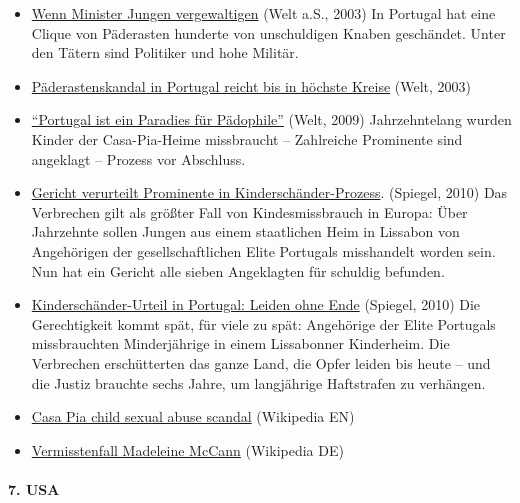 \begin{itemize}
\tightlist
\item
  \href{https://www.welt.de/print-wams/article98058/Wenn-Minister-Jungen-vergewaltigen.html}{Wenn
  Minister Jungen vergewaltigen} (Welt a.S., 2003) In Portugal hat eine
  Clique von Päderasten hunderte von unschuldigen Knaben geschändet.
  Unter den Tätern sind Politiker und hohe Militär.
\item
  \href{https://www.welt.de/print-welt/article239535/Paederastenskandal-in-Portugal-reicht-bis-in-hoechste-Kreise.html}{Päderastenskandal
  in Portugal reicht bis in höchste Kreise} (Welt, 2003)
\item
  \href{https://www.welt.de/welt_print/article3028080/Portugal-ist-ein-Paradies-fuer-Paedophile.html}{``Portugal
  ist ein Paradies für Pädophile''} (Welt, 2009) Jahrzehntelang wurden
  Kinder der Casa-Pia-Heime missbraucht -- Zahlreiche Prominente sind
  angeklagt -- Prozess vor Abschluss.
\item
  \href{http://www.spiegel.de/panorama/justiz/portugal-gericht-verurteilt-prominente-in-kinderschaender-prozess-a-715570.html}{Gericht
  verurteilt Prominente in Kinderschänder-Prozess}. (Spiegel, 2010) Das
  Verbrechen gilt als größter Fall von Kindesmissbrauch in Europa: Über
  Jahrzehnte sollen Jungen aus einem staatlichen Heim in Lissabon von
  Angehörigen der gesellschaftlichen Elite Portugals misshandelt worden
  sein. Nun hat ein Gericht alle sieben Angeklagten für schuldig
  befunden.
\item
  \href{http://www.spiegel.de/panorama/justiz/kinderschaender-urteil-in-portugal-leiden-ohne-ende-a-715627.html}{Kinderschänder-Urteil
  in Portugal: Leiden ohne Ende} (Spiegel, 2010) Die Gerechtigkeit kommt
  spät, für viele zu spät: Angehörige der Elite Portugals missbrauchten
  Minderjährige in einem Lissabonner Kinderheim. Die Verbrechen
  erschütterten das ganze Land, die Opfer leiden bis heute -- und die
  Justiz brauchte sechs Jahre, um langjährige Haftstrafen zu verhängen.
\item
  \href{https://en.wikipedia.org/wiki/Casa_Pia_child_sexual_abuse_scandal}{Casa
  Pia child sexual abuse scandal} (Wikipedia EN)
\item
  \href{https://de.wikipedia.org/wiki/Vermisstenfall_Madeleine_McCann}{Vermisstenfall
  Madeleine McCann} (Wikipedia DE)
\end{itemize}

\hypertarget{7-usa}{%
\paragraph{7. USA}\label{7-usa}}

